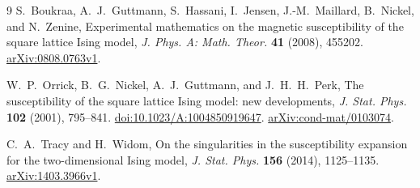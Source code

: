 \documentclass[11pt]{article}
\numberwithin{equation}{section}
\theoremstyle{definition}
\begin{document}
\clearpage
\begin{thebibliography}{9}
S.~Boukraa, A.~J.~Guttmann, S.~Hassani, I.~Jensen,
J.-M.~Maillard, B.~Nickel, and N.~Zenine,
Experimental mathematics on the magnetic susceptibility of the
square lattice Ising model,
\emph{J. Phys. A: Math. Theor.} \textbf{41} (2008), 455202.
\href{https://arxiv.org/abs/0808.0763v1}{arXiv:0808.0763v1}.

W.~P.~Orrick, B.~G.~Nickel, A.~J.~Guttmann, and J.~H.~H.~Perk,
The susceptibility of the square lattice Ising model: new developments,
\emph{J. Stat. Phys.} \textbf{102} (2001), 795--841.
\href{https://doi.org/10.1023/A:1004850919647}{doi:10.1023/A:1004850919647}.
\href{https://arxiv.org/abs/cond-mat/0103074}{arXiv:cond-mat/0103074}.

C.~A.~Tracy and H.~Widom,
On the singularities in the susceptibility expansion for the
two-dimensional Ising model,
\emph{J. Stat. Phys.} \textbf{156} (2014), 1125--1135.
\href{https://arxiv.org/abs/1403.3966v1}{arXiv:1403.3966v1}.

\end{thebibliography}
\end{document}
